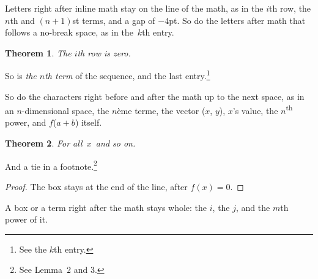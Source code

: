 \documentclass{article}
\newtheorem{theorem}{Theorem}
\newcommand{\term}[1]{#1}
\begin{document}
Letters right after inline math stay on the line of the math, as in the
$i$th row, the $n$th and $(n+1)$st terms, and a gap of $-4$pt. So do
the letters after math that follows a no-break space, as in the~$k$th
entry.

\begin{theorem}The $i$th row is zero.\end{theorem}

So is \emph{the $n$th term} of the sequence, and the last
entry.\footnote{See the $k$th entry.}

So do the characters right before and after the math up to the next
space, as in an $n$-dimensional space, the $n$\`eme terme, the vector
($x$, $y$), $x$'s value, the $n$\textsuperscript{th} power, and
$f$($a + b$) itself.

\begin{theorem}For all~$x$~and so on.\end{theorem}
And a tie in a footnote.\footnote{See Lemma~$2$ and $3$.}

\begin{proof}The box stays at the end of the line, after $f(x)=0$.\end{proof}

A box or a term right after the math stays whole: the $i$,
the $j$, and the $m$\term{th power} of it.
\end{document}
